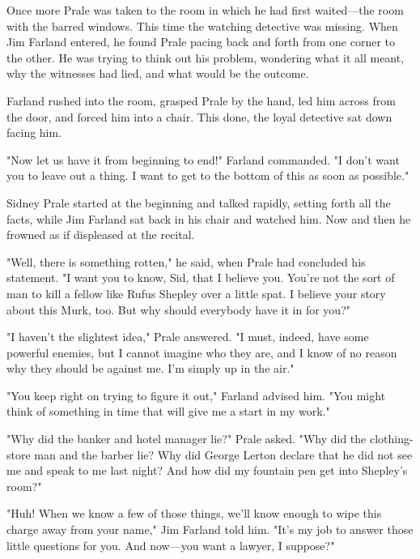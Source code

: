 \documentclass{novel}
\begin{document}
\begin{ChapterStart}
\vspace{3\nbs}
\end{ChapterStart}
    
Once more Prale was taken to the room in which he had first waited---the room with the barred windows. This time the watching detective was missing. When Jim Farland entered, he found Prale pacing back and forth from one corner to the other. He was trying to think out his problem, wondering what it all meant, why the witnesses had lied, and what would be the outcome.

Farland rushed into the room, grasped Prale by the hand, led him across from the door, and forced him into a chair. This done, the loyal detective sat down facing him.

"Now let us have it from beginning to end!" Farland commanded. "I don't want you to leave out a thing. I want to get to the bottom of this as soon as possible."

Sidney Prale started at the beginning and talked rapidly, setting forth all the facts, while Jim Farland sat back in his chair and watched him. Now and then he frowned as if displeased at the recital.

"Well, there is something rotten," he said, when Prale had concluded his statement. "I want you to know, Sid, that I believe you. You're not the sort of man to kill a fellow like Rufus Shepley over a little spat. I believe your story about this Murk, too. But why should everybody have it in for you?"

"I haven't the slightest idea," Prale answered. "I must, indeed, have some powerful enemies, but I cannot imagine who they are, and I know of no reason why they should be against me. I'm simply up in the air."

"You keep right on trying to figure it out," Farland advised him. "You might think of something in time that will give me a start in my work."

"Why did the banker and hotel manager lie?" Prale asked. "Why did the clothing-store man and the barber lie? Why did George Lerton declare that he did not see me and speak to me last night? And how did my fountain pen get into Shepley's room?"

"Huh! When we know a few of those things, we'll know enough to wipe this charge away from your name," Jim Farland told him. "It's my job to answer those little questions for you. And now---you want a lawyer, I suppose?"
\end{document}
